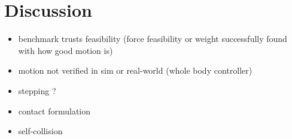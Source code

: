 \section{Discussion} \label{sec:discussion}
\begin{itemize}
  \item benchmark trusts feasibility (force feasibility or weight successfully found with how good motion is)
  \item motion not verified in sim or real-world (whole body controller)
  \item stepping ?
  \item contact formulation
  \item self-collision
\end{itemize}
